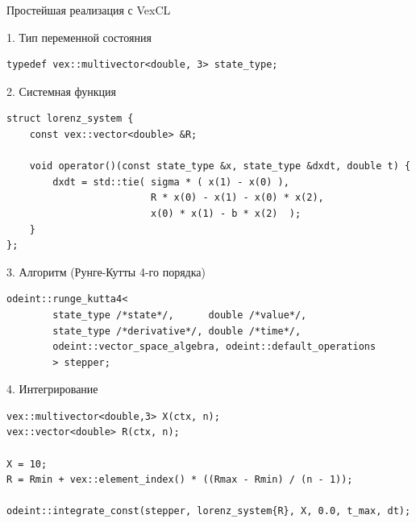 \documentclass[@BEAMER_OPTIONS@]{beamer}
\begin{document}
\begin{frame}[fragile]{Простейшая реализация с VexCL}
    \begin{exampleblock}{1. Тип переменной состояния}
        \begin{lstlisting}
typedef vex::multivector<double, 3> state_type;
        \end{lstlisting}
    \end{exampleblock}

    \begin{exampleblock}{2. Системная функция}
        \begin{lstlisting}[firstnumber=last]
struct lorenz_system {
    const vex::vector<double> &R;

    void operator()(const state_type &x, state_type &dxdt, double t) {
        dxdt = std::tie( sigma * ( x(1) - x(0) ),
                         R * x(0) - x(1) - x(0) * x(2),
                         x(0) * x(1) - b * x(2)  );
    }
};
        \end{lstlisting}
    \end{exampleblock}
\end{frame}


\begin{frame}[fragile]{}
    \begin{exampleblock}{3. Алгоритм (Рунге-Кутты 4-го порядка)}
        \begin{lstlisting}[firstnumber=last]
odeint::runge_kutta4<
        state_type /*state*/,      double /*value*/,
        state_type /*derivative*/, double /*time*/,
        odeint::vector_space_algebra, odeint::default_operations
        > stepper;
        \end{lstlisting}
    \end{exampleblock}
    \begin{exampleblock}{4. Интегрирование}
        \begin{lstlisting}[firstnumber=last]
vex::multivector<double,3> X(ctx, n);
vex::vector<double> R(ctx, n);

X = 10;
R = Rmin + vex::element_index() * ((Rmax - Rmin) / (n - 1));

odeint::integrate_const(stepper, lorenz_system{R}, X, 0.0, t_max, dt);
        \end{lstlisting}
    \end{exampleblock}
\end{frame}
\end{document}
